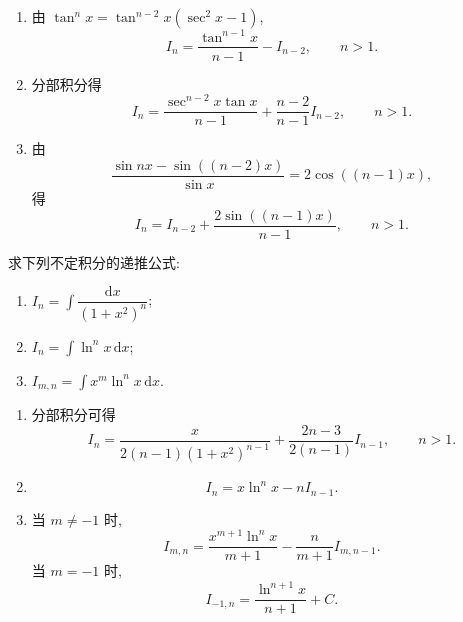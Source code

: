 \begin{solution}
    \begin{enumerate}
        \item 由 $\tan^n x=\tan^{n-2}x(\sec^2x-1)$,
              \[
                  I_n=\dfrac{\tan^{n-1}x}{n-1}-I_{n-2},
                  \qquad n>1.
              \]
        \item 分部积分得
              \[
                  I_n=\dfrac{\sec^{n-2}x\tan x}{n-1}
                  +\dfrac{n-2}{n-1}I_{n-2},
                  \qquad n>1.
              \]
        \item 由
              \[
                  \dfrac{\sin nx-\sin((n-2)x)}{\sin x}=2\cos((n-1)x),
              \]
              得
              \[
                  I_n=I_{n-2}+\dfrac{2\sin((n-1)x)}{n-1},
                  \qquad n>1.
              \]
    \end{enumerate}
\end{solution}

\begin{example}
    求下列不定积分的递推公式:
    \begin{enumerate}
        \item $\displaystyle I_n=\int\dfrac{\mathrm{d}x}{(1+x^2)^n}$;
        \item $\displaystyle I_n=\int\ln^n x\,\mathrm{d}x$;
        \item $\displaystyle I_{m,n}=\int x^m\ln^n x\,\mathrm{d}x$.
    \end{enumerate}
\end{example}
\exampleblank

\begin{solution}
    \begin{enumerate}
        \item 分部积分可得
              \[
                  I_n=\dfrac{x}{2(n-1)(1+x^2)^{n-1}}
                  +\dfrac{2n-3}{2(n-1)}I_{n-1},
                  \qquad n>1.
              \]
        \item
              \[
                  I_n=x\ln^n x-nI_{n-1}.
              \]
        \item 当 $m\neq-1$ 时,
              \[
                  I_{m,n}=\dfrac{x^{m+1}\ln^n x}{m+1}
                  -\dfrac{n}{m+1}I_{m,n-1}.
              \]
              当 $m=-1$ 时,
              \[
                  I_{-1,n}=\dfrac{\ln^{n+1}x}{n+1}+C.
              \]
    \end{enumerate}
\end{solution}


